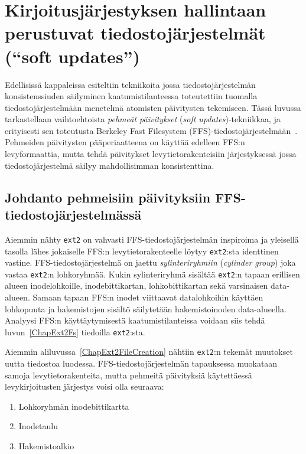 \section{Kirjoitusjärjestyksen hallintaan perustuvat tiedostojärjestelmät (``soft updates'')}
\label{ChapSoftUpdates}
Edellisissä kappaleissa esiteltiin tekniikoita jossa tiedostojärjestelmän konsistenssiuden säilyminen kaatumistilanteessa toteutettiin tuomalla tiedostojärjestelmään menetelmä atomisten päivitysten tekemiseen.
Tässä luvussa tarkastellaan vaihtoehtoista \emph{pehmeät päivitykset} (\emph{soft updates})-tekniikkaa,
ja erityisesti sen toteutusta Berkeley Fast Filesystem (FFS)-tiedostojärjestelmään~\cite{SoftUpdatesFfs}.
Pehmeiden päivitysten pääperiaatteena on käyttää edelleen FFS:n levyformaattia,
mutta tehdä päivitykset levytietorakenteisiin järjestyksessä jossa tiedostojärjestelmä säilyy mahdollisimman konsistenttina.

\subsection{Johdanto pehmeisiin päivityksiin FFS-tiedostojärjestelmässä}
Aiemmin nähty \texttt{ext2} on vahvasti FFS-tiedostojärjestelmän inspiroima
ja yleisellä tasolla lähes jokaiselle FFS:n levytietorakenteelle löytyy \texttt{ext2}:sta identtinen vastine.
FFS-tiedostojärjestelmä on jaettu \emph{sylinteriryhmiin} (\emph{cylinder group}) joka vastaa \texttt{ext2}:n lohkoryhmää.
Kukin sylinteriryhmä sisältää \texttt{ext2}:n tapaan erillisen alueen inodelohkoille, inodebittikartan, lohkobittikartan sekä varsinaisen data-alueen.
Samaan tapaan FFS:n inodet viittaavat datalohkoihin käyttäen lohkopuuta ja hakemistojen sisältö säilytetään hakemistoinoden data-alueella.
Analyysi FFS:n käyttäytymisestä kaatumistilanteissa voidaan siis tehdä luvun~\ref{ChapExt2Fs} tiedoilla \texttt{ext2}:sta.

Aiemmin aliluvussa~\ref{ChapExt2FileCreation} nähtiin \texttt{ext2}:n tekemät muutokset uutta tiedostoa luodessa.
FFS-tiedostojärjestelmän tapauksessa muokataan samoja levytietorakenteita,
mutta pehmeitä päivityksiä käytettäessä levykirjoitusten järjestys voisi olla seuraava:
\begin{enumerate}
    \item{Lohkoryhmän inodebittikartta}
    \item{Inodetaulu}
    \item{Hakemistoalkio}
\end{enumerate}

